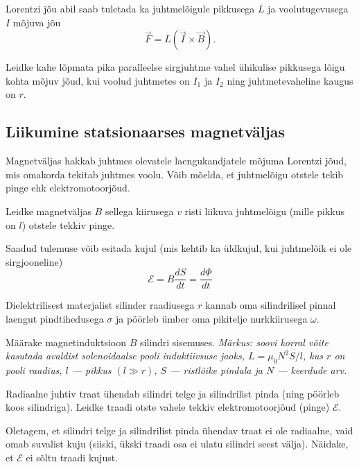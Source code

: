 \documentclass[a4paper,11pt,twocolumn]{article}
\begin{document}
Lorentzi jõu abil saab tuletada ka juhtmelõigule pikkusega $L$ ja voolutugevusega $I$ mõjuva jõu 
\begin{equation}
\vec{F}=L(\vec{I}\times \vec{B}) \tag{Ampere'i seadus}.
\end{equation}

\begin{question}
	Leidke kahe lõpmata pika paralleelse sirgjuhtme vahel ühikulise pikkusega lõigu kohta mõjuv jõud, kui voolud juhtmetes on \( I_1 \) ja \( I_2 \) ning juhtmetevaheline kaugus on \( r \).
\end{question}

\subsection{Liikumine statsionaarses magnetväljas}

Magnetväljas hakkab juhtmes olevatele laengukandjatele mõjuma Lorentzi jõud, mis omakorda tekitab juhtmes voolu. Võib mõelda, et juhtmelõigu otstele tekib pinge ehk elektromotoorjõud.

\begin{question}
	Leidke magnetväljas $B$ sellega kiirusega $v$ risti liikuva juhtmelõigu (mille pikkus on $l$) otstele tekkiv pinge.
\end{question}

Saadud tulemuse võib esitada kujul (mis kehtib ka üldkujul, kui juhtmelõik ei ole sirgjooneline)
\[ \mathcal{E}=B \frac{dS}{dt}=\frac{d\Phi}{dt} \]

\begin{question}[E-S 2011, P3]
	Dielektrilisest materjalist silinder raadiusega $r$ kannab oma silindrilisel pinnal laengut pindtihedusega $\sigma$ ja pöörleb ümber oma pikitelje nurkkiirusega $\omega$.
	\begin{subquestion}
		\item Määrake magnetinduktsioon $B$ silindri sisemuses. \textit{Märkus: soovi korral võite kasutada avaldist solenoidaalse pooli induktiivsuse jaoks, $L = \mu_0 N^{2}S/l$, kus $r$ on pooli raadius, $l$ — pikkus $(l\gg r)$, $S$ — ristlõike pindala ja $N$ — keerdude arv.}
		\item Radiaalne juhtiv traat ühendab silindri telge ja silindrilist pinda (ning pöörleb koos silindriga). Leidke traadi otste vahele tekkiv elektromotoorjõud (pinge) $\mathcal{E}$.
		\item Oletagem, et silindri telge ja silindrilist pinda ühendav traat ei ole radiaalne, vaid omab suvalist kuju (siiski, ükski traadi osa ei ulatu silindri seest välja). Näidake, et $\mathcal{E}$ ei sõltu traadi kujust.
	\end{subquestion}
\end{question}
\end{document}
